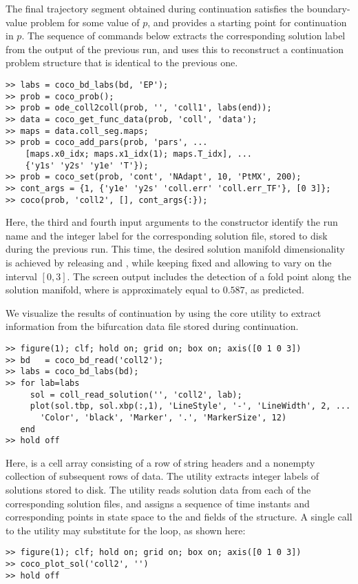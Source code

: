 The final trajectory segment obtained during continuation satisfies the boundary-value problem for some value of $p$, and provides a starting point for continuation in $p$. The sequence of commands below extracts the corresponding solution label from the  output of the previous run, and uses this to reconstruct a continuation problem structure that is identical to the previous one.
\begin{lstlisting}[language=coco-highlight]
>> labs = coco_bd_labs(bd, 'EP');
>> prob = coco_prob();
>> prob = ode_coll2coll(prob, '', 'coll1', labs(end));
>> data = coco_get_func_data(prob, 'coll', 'data');
>> maps = data.coll_seg.maps;
>> prob = coco_add_pars(prob, 'pars', ...
    [maps.x0_idx; maps.x1_idx(1); maps.T_idx], ...
    {'y1s' 'y2s' 'y1e' 'T'});
>> prob = coco_set(prob, 'cont', 'NAdapt', 10, 'PtMX', 200);
>> cont_args = {1, {'y1e' 'y2s' 'coll.err' 'coll.err_TF'}, [0 3]};
>> coco(prob, 'coll2', [], cont_args{:});
\end{lstlisting}
Here, the third and fourth input arguments to the  constructor identify the run name and the integer label for the corresponding solution file, stored to disk during the previous run. This time, the desired solution manifold dimensionality is achieved by releasing  and , while keeping  fixed and allowing  to vary on the interval $[0,3]$. The screen output includes the detection of a fold point along the solution manifold, where  is approximately equal to $0.587$, as predicted.

We visualize the results of continuation by using the  core utility to extract information from the bifurcation data file stored during continuation.
\begin{lstlisting}[language=coco-highlight]
>> figure(1); clf; hold on; grid on; box on; axis([0 1 0 3])
>> bd   = coco_bd_read('coll2');
>> labs = coco_bd_labs(bd);
>> for lab=labs
     sol = coll_read_solution('', 'coll2', lab);
     plot(sol.tbp, sol.xbp(:,1), 'LineStyle', '-', 'LineWidth', 2, ...
       'Color', 'black', 'Marker', '.', 'MarkerSize', 12)
   end
>> hold off
\end{lstlisting}
Here,  is a cell array consisting of a row of string headers and a nonempty collection of subsequent rows of data. The  utility extracts integer labels of solutions stored to disk. The  utility reads solution data from each of the corresponding solution files, and assigns a sequence of time instants and corresponding points in state space to the  and  fields of the  structure. A single call to the  utility may substitute for the  loop, as shown here:
\begin{lstlisting}[language=coco-highlight]
>> figure(1); clf; hold on; grid on; box on; axis([0 1 0 3])
>> coco_plot_sol('coll2', '')
>> hold off
\end{lstlisting}
\medskip

